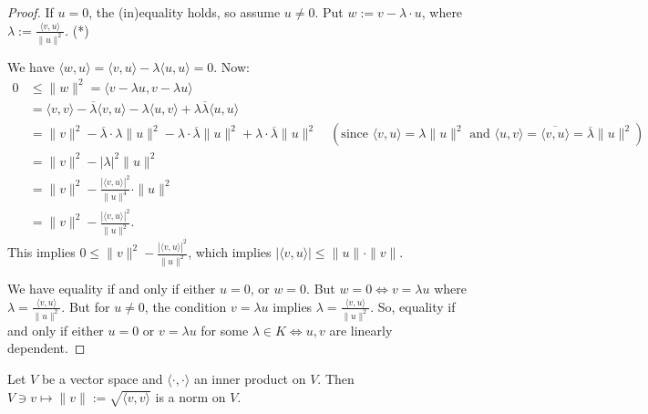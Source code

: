 \begin{proof}
    If $u = 0$, the (in)equality holds, so assume $u \neq 0$. 
    Put $w := v - \lambda \cdot u$, where $\lambda := \frac{\langle v, u \rangle}{\|u\|^2}$. (*)
    
    We have $\langle w, u \rangle = \langle v, u \rangle - \lambda \langle u, u \rangle = 0$.
    Now:
    \begin{align*}
        0 &\leq \|w\|^2 = \langle v - \lambda u, v - \lambda u \rangle \\
        &= \langle v, v \rangle - \overline{\lambda} \langle v, u \rangle - \lambda \langle u, v \rangle + \lambda \overline{\lambda} \langle u, u \rangle \\
        &= \|v\|^2 - \overline{\lambda} \cdot \lambda \|u\|^2 - \lambda \cdot \overline{\lambda} \|u\|^2 + \lambda \cdot \overline{\lambda} \|u\|^2 \quad \left(\text{since } \langle v, u \rangle = \lambda \|u\|^2 \text{ and } \langle u, v \rangle = \overline{\langle v, u \rangle} = \overline{\lambda} \|u\|^2\right) \\
        &= \|v\|^2 - |\lambda|^2 \|u\|^2 \\
        &= \|v\|^2 - \frac{|\langle v, u \rangle|^2}{\|u\|^4} \cdot \|u\|^2 \\
        &= \|v\|^2 - \frac{|\langle v, u \rangle|^2}{\|u\|^2}.
    \end{align*}
    This implies $0 \leq \|v\|^2 - \frac{|\langle v, u \rangle|^2}{\|u\|^2}$, which implies $|\langle v, u \rangle| \leq \|u\| \cdot \|v\|$.
    
    We have equality if and only if either $u = 0$, or $w = 0$.
    But $w = 0 \iff v = \lambda u$ where $\lambda = \frac{\langle v, u \rangle}{\|u\|^2}$.
    But for $u \neq 0$, the condition $v = \lambda u$ implies $\lambda = \frac{\langle v, u \rangle}{\|u\|^2}$.
    So, equality if and only if either $u = 0$ or $v = \lambda u$ for some $\lambda \in K \iff u, v$ are linearly dependent.
\end{proof}

\begin{corollary}
\label{cor:norm_induced}
    Let $V$ be a vector space and $\langle \cdot, \cdot \rangle$ an inner product on $V$. Then $V \ni v \mapsto \|v\| := \sqrt{\langle v, v \rangle}$ is a norm on $V$.
\end{corollary}

